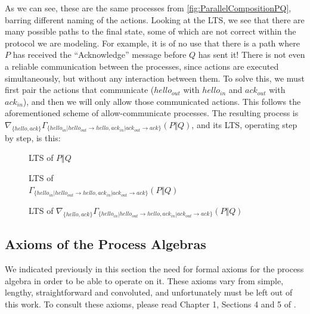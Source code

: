 \documentclass[11pt]{article}
\theoremstyle{definition}
\theoremstyle{plain}
\begin{document}
As we can see, these are the same processes from \ref{fig:ParallelCompositionPQ}, barring different naming of the actions. Looking at the LTS, we see that there are many possible paths to the final state, some of which are not correct within the protocol we are modeling. For example, it is of no use that there is a path where $ P $ has received the ``Acknowledge'' message before $ Q $ has sent it! There is not even a reliable communication between the processes, since actions are executed simultaneously, but without any interaction between them. To solve this, we must first pair the actions that communicate ($ hello_{out} $ with $ hello_{in} $ and $ ack_{out} $ with $ ack_{in} $), and then we will only allow those communicated actions. This follows the aforementioned scheme of allow-communicate processes. The resulting process is $ \nabla_{\{hello, ack\}}\Gamma_{\{hello_{in} | hello_{out} \rightarrow hello, ack_{in} | ack_{out} \rightarrow ack\}}(P \Vert Q) $, and its LTS, operating step by step, is this:

\begin{figure}[H]
	\centering
	\scalebox{.5}{}
	\caption{LTS of $ P \Vert Q $} \label{fig:CommunicationOperatorProcess}
	\endminipage\hfill
	\centering
	\scalebox{.5}{}
	\caption{LTS of \\$\Gamma_{\{hello_{in} | hello_{out} \rightarrow hello, ack_{in} | ack_{out} \rightarrow ack\}}(P \Vert Q) $} \label{fig:CommunicationOperatorCommunicate}
	\endminipage\hfill
\end{figure}
\begin{figure}[H]
	\centering
	
	\caption{LTS of $ \nabla_{\{hello, ack\}}\Gamma_{\{hello_{in} | hello_{out} \rightarrow hello, ack_{in} | ack_{out} \rightarrow ack\}}(P \Vert Q) $} \label{fig:CommunicationOperatorAllow}
\end{figure}

\subsection{Axioms of the Process Algebras}

We indicated previously in this section the need for formal axioms for the process algebra in order to be able to operate on it. These axioms vary from simple, lengthy, straightforward and convoluted, and unfortunately must be left out of this work. To consult these axioms, please read Chapter 1, Sections 4 and 5 of \cite{Groote:2014:MAC:2628007}.
\end{document}

